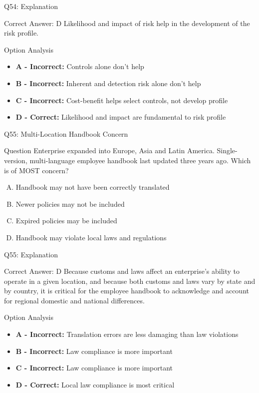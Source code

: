 \documentclass{beamer}
\begin{document}
	\begin{frame}{Q54: Explanation}
		\begin{block}{Correct Answer: D}
			Likelihood and impact of risk help in the development of the risk profile.
		\end{block}
		\begin{block}{Option Analysis}
			\begin{itemize}
				\item \textbf{A - Incorrect:} Controls alone don't help
				\item \textbf{B - Incorrect:} Inherent and detection risk alone don't help
				\item \textbf{C - Incorrect:} Cost-benefit helps select controls, not develop profile
				\item \textbf{D - Correct:} Likelihood and impact are fundamental to risk profile
			\end{itemize}
		\end{block}
	\end{frame}
	
	\begin{frame}{Q55: Multi-Location Handbook Concern}
		\begin{block}{Question}
			Enterprise expanded into Europe, Asia and Latin America. Single-version, multi-language employee handbook last updated three years ago. Which is of MOST concern?
		\end{block}
		\begin{enumerate}[(A)]
			\item Handbook may not have been correctly translated
			\item Newer policies may not be included
			\item Expired policies may be included
			\item Handbook may violate local laws and regulations
		\end{enumerate}
	\end{frame}
	
	\begin{frame}{Q55: Explanation}
		\begin{block}{Correct Answer: D}
			Because customs and laws affect an enterprise's ability to operate in a given location, and because both customs and laws vary by state and by country, it is critical for the employee handbook to acknowledge and account for regional domestic and national differences.
		\end{block}
		\begin{block}{Option Analysis}
			\begin{itemize}
				\item \textbf{A - Incorrect:} Translation errors are less damaging than law violations
				\item \textbf{B - Incorrect:} Law compliance is more important
				\item \textbf{C - Incorrect:} Law compliance is more important
				\item \textbf{D - Correct:} Local law compliance is most critical
			\end{itemize}
		\end{block}
	\end{frame}
	
\end{document}
